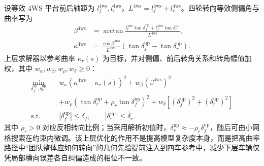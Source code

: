 \documentclass[twocolumn,3p,times,procedia]{elsarticle}
\begin{document}
设等效 4WS 平台前后轴距为 $l_f^{\mathrm{4ws}},l_r^{\mathrm{4ws}}$，$L^{\mathrm{4ws}}=l_f^{\mathrm{4ws}}+l_r^{\mathrm{4ws}}$。四轮转向等效侧偏角与曲率写为
\begin{equation}
\begin{aligned}
\beta^{\mathrm{4ws}} &=
\arctan\frac{l_r^{\mathrm{4ws}}\tan\delta_f^{\mathrm{up}}+l_f^{\mathrm{4ws}}\tan\delta_r^{\mathrm{up}}}{L^{\mathrm{4ws}}},\\
\kappa^{\mathrm{4ws}} &=
\frac{\cos\beta^{\mathrm{4ws}}}{L^{\mathrm{4ws}}}
\left(\tan\delta_f^{\mathrm{up}}-\tan\delta_r^{\mathrm{up}}\right).
\end{aligned}
\label{eq:fourws_beta_curvature}
\end{equation}
上层求解器以参考曲率 $\kappa_r(s)$ 为目标，并对侧偏、前后转角关系和转角幅值加权，其中 $w_\kappa,w_\beta,w_\rho,w_\delta\ge0$：
\begin{equation}
\begin{aligned}
\min_{\delta_f^{\mathrm{up}},\delta_r^{\mathrm{up}}}\quad
&w_\kappa\left(\kappa^{\mathrm{4ws}}-\kappa_r(s)\right)^2
+w_\beta\left(\beta^{\mathrm{4ws}}\right)^2\\
&+w_\rho\left(\tan\delta_r^{\mathrm{up}}+\rho_r\tan\delta_f^{\mathrm{up}}\right)^2
+w_\delta\left[\left(\delta_f^{\mathrm{up}}\right)^2+\left(\delta_r^{\mathrm{up}}\right)^2\right]\\
\mathrm{s.t.}\quad
&|\delta_f^{\mathrm{up}}|\le \bar\delta_f,\qquad
|\delta_r^{\mathrm{up}}|\le \bar\delta_r .
\end{aligned}
\label{eq:fourws_upper_opt}
\end{equation}
其中 $\rho_r>0$ 对应反相转向比例；当采用解析初值时，$\delta_r^{\mathrm{up}}\approx-\rho_r\delta_f^{\mathrm{up}}$，随后可由小网格搜索在约束内微调。该上层优化的作用不是提高模型复杂度本身，而是把高曲率路径中“团队整体应如何转向”的几何先验提前注入到四车参考中，减少下层车辆仅凭局部横向误差各自纠偏造成的相位不一致。
\end{document}
